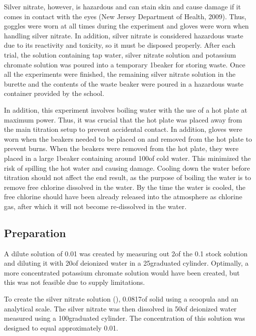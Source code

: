 \documentclass[11pt]{article}
\begin{document}
Silver nitrate, however, is hazardous and can stain skin and cause damage if it comes in contact with the eyes (New Jersey Department of Health, 2009). Thus, goggles were worn at all times during the experiment and gloves were worn when handling silver nitrate. In addition, silver nitrate is considered hazardous waste due to its reactivity and toxicity, so it must be disposed properly. After each trial, the solution containing tap water, silver nitrate solution and potassium chromate solution was poured into a temporary 1\litre beaker for storing waste. Once all the experiments were finished, the remaining silver nitrate solution in the burette and the contents of the waste beaker were poured in a hazardous waste container provided by the school.

In addition, this experiment involves boiling water with the use of a hot plate at maximum power. Thus, it was crucial that the hot plate was placed away from the main titration setup to prevent accidental contact. In addition, gloves were worn when the beakers needed to be placed on and removed from the hot plate to prevent burns. When the beakers were removed from the hot plate, they were placed in a large 1\litre beaker containing around 100\ml of cold water. This minimized the risk of spilling the hot water and causing damage. Cooling down the water before titration should not affect the end result, as the purpose of boiling the water is to remove free chlorine dissolved in the water. By the time the water is cooled, the free chlorine should have been already released into the atmosphere as chlorine gas, after which it will not become re-dissolved in the water.

\subsection{Preparation}

A dilute solution of 0.01\mpl {} was created by measuring out 2\ml of the 0.1\mpl {} stock solution and diluting it with 20\ml of deionized water in a 25\ml graduated cylinder. Optimally, a more concentrated potassium chromate solution would have been created, but this was not feasible due to supply limitations.

To create the silver nitrate solution (), 0.0817\gram of solid  using a scoopula and an analytical scale. The silver nitrate was then dissolved in 50\ml of deionized water measured using a 100\ml graduated cylinder. The concentration of this solution was designed to equal approximately 0.01\mpl.
\end{document}
